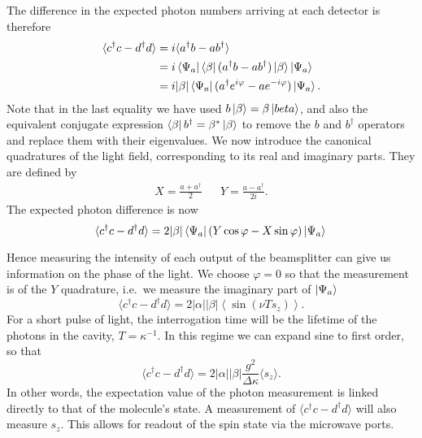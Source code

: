 The difference in the expected photon numbers arriving at each
detector is therefore
%
\begin{align}
  \langle c^\dagger c - d^\dagger d\rangle &= i\langle a^\dagger b-
  ab^\dagger \rangle \\
  &= i \bra{\Psi_a}\bra{\beta}(a^\dagger b-
  ab^\dagger)\ket{\beta}\ket{\Psi_a} \\
  & = i|\beta| \bra{\Psi_a}(a^\dagger e^{i\varphi} - a
  e^{-i\varphi})\ket{\Psi_a}.
\end{align}
%
Note that in the last equality we have used $b\ket{\beta}=\beta\ket{beta}$, and
also the equivalent conjugate expression $\bra{\beta}b^\dagger =
\beta^*\ket{\beta}$ to remove the $b$ and $b^\dagger$ operators and replace
them with their eigenvalues.
%
We now introduce the canonical quadratures of the light field, corresponding to
its real and imaginary parts. They are defined by~\cite{gerry_knight_2004}
%
\begin{align}
  X = \frac{a + a^\dagger}{2} && Y = \frac{a - a^\dagger}{2i}.
\end{align}
%
The expected photon difference is now
\begin{equation}
  \langle c^\dagger c - d^\dagger d\rangle =
  2|\beta|\bra{\Psi_a}(Y\cos\varphi - X\sin\varphi)\ket{\Psi_a} \\
  \label{squeeze:eqn:homoquads}
\end{equation}

Hence measuring the intensity of each output of the beamsplitter can give us
information on the phase of the light. We choose $\varphi = 0$ so that the
measurement is of the $Y$ quadrature, i.e.\ we measure the imaginary part of
$\ket{\Psi_a}$
%
\begin{equation}
  \langle c^\dagger c - d^\dagger d\rangle =  2
  |\alpha||\beta|\left\langle\sin(\nu T s_z)\right\rangle.
\end{equation}
%
For a short pulse of light, the interrogation time will be the lifetime of the
photons in the cavity, $T = \kappa^{-1}$. In this regime we can expand sine
to first order, so that
%
\begin{equation}
  \langle c^\dagger c - d^\dagger d\rangle = 2|\alpha||\beta|
  \frac{g^2}{\Delta\kappa}\langle s_z\rangle.
  \label{mws:eqn:homomeas}
\end{equation}
%
In other words, the expectation value of the photon measurement is linked
directly to that of the molecule's state. A measurement of $\langle c^\dagger c
- d^\dagger d\rangle$ will also measure $s_z$. This allows for readout of the
spin state via the microwave ports.

